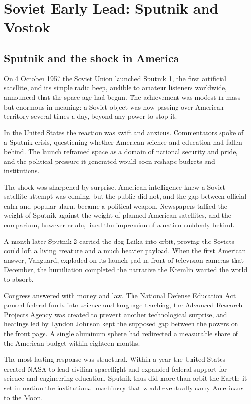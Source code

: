 \section{Soviet Early Lead: Sputnik and Vostok}

\subsection{Sputnik and the shock in America}
On 4 October 1957 the Soviet Union launched Sputnik 1, the first artificial satellite, and its simple radio beep, audible to amateur listeners worldwide, announced that the space age had begun. The achievement was modest in mass but enormous in meaning: a Soviet object was now passing over American territory several times a day, beyond any power to stop it.

In the United States the reaction was swift and anxious. Commentators spoke of a Sputnik crisis, questioning whether American science and education had fallen behind. The launch reframed space as a domain of national security and pride, and the political pressure it generated would soon reshape budgets and institutions.

The shock was sharpened by surprise. American intelligence knew a Soviet satellite attempt was coming, but the public did not, and the gap between official calm and popular alarm became a political weapon. Newspapers tallied the weight of Sputnik against the weight of planned American satellites, and the comparison, however crude, fixed the impression of a nation suddenly behind.

A month later Sputnik 2 carried the dog Laika into orbit, proving the Soviets could loft a living creature and a much heavier payload. When the first American answer, Vanguard, exploded on its launch pad in front of television cameras that December, the humiliation completed the narrative the Kremlin wanted the world to absorb.

Congress answered with money and law. The National Defense Education Act poured federal funds into science and language teaching, the Advanced Research Projects Agency was created to prevent another technological surprise, and hearings led by Lyndon Johnson kept the supposed gap between the powers on the front page. A single aluminum sphere had redirected a measurable share of the American budget within eighteen months.

The most lasting response was structural. Within a year the United States created NASA to lead civilian spaceflight and expanded federal support for science and engineering education. Sputnik thus did more than orbit the Earth; it set in motion the institutional machinery that would eventually carry Americans to the Moon. \cite{cadbury2006} \cite{nasa2019}

